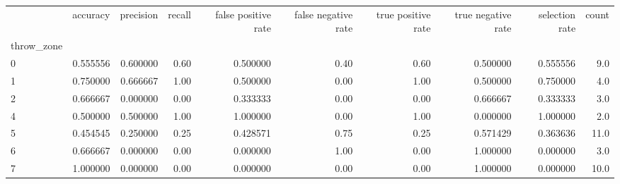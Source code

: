 \begin{tabular}{lrrrrrrrrr}
\toprule
{} &  accuracy &  precision &  recall &  false positive rate &  false negative rate &  true positive rate &  true negative rate &  selection rate &  count \\
throw\_zone &           &            &         &                      &                      &                     &                     &                 &        \\
\midrule
0          &  0.555556 &   0.600000 &    0.60 &             0.500000 &                 0.40 &                0.60 &            0.500000 &        0.555556 &    9.0 \\
1          &  0.750000 &   0.666667 &    1.00 &             0.500000 &                 0.00 &                1.00 &            0.500000 &        0.750000 &    4.0 \\
2          &  0.666667 &   0.000000 &    0.00 &             0.333333 &                 0.00 &                0.00 &            0.666667 &        0.333333 &    3.0 \\
4          &  0.500000 &   0.500000 &    1.00 &             1.000000 &                 0.00 &                1.00 &            0.000000 &        1.000000 &    2.0 \\
5          &  0.454545 &   0.250000 &    0.25 &             0.428571 &                 0.75 &                0.25 &            0.571429 &        0.363636 &   11.0 \\
6          &  0.666667 &   0.000000 &    0.00 &             0.000000 &                 1.00 &                0.00 &            1.000000 &        0.000000 &    3.0 \\
7          &  1.000000 &   0.000000 &    0.00 &             0.000000 &                 0.00 &                0.00 &            1.000000 &        0.000000 &   10.0 \\
\bottomrule
\end{tabular}
